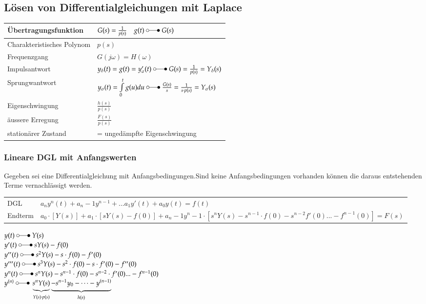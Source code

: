 \subsection{Lösen von Differentialgleichungen mit Laplace}
\begin{minipage}{11.5cm}
	\begin{tabular}{| l | l |}
		\hline
		Übertragungsfunktion & $G(s) = \frac{1}{p(s)} \quad g(t) \; \laplace \; G(s)$\\
		\hline Charakteristisches Polynom & $p(s)$\\
		\hline
		Frequenzgang & $G(j\omega) = H(\omega)$ \\
		\hline
		Impulsantwort & $y_{\delta}(t) = g(t) = y_{\sigma}'(t) \; \laplace \; G(s) = \frac{1}{p(s)}=Y_{\delta}(s)$\\
		\hline
		Sprungwantwort & $y_{\sigma}(t)=\int\limits_0^t g(u) du \; \laplace \; \frac{G(s)}{s} = \frac{1}{s \cdot p(s)} = Y_{\sigma}(s)$\\
		\hline
		Eigenschwingung & $\frac{h(s)}{p(s)}$ \\
		\hline
		äussere Erregung & $\frac{F(s)}{p(s)}$ \\
		\hline
		stationärer Zustand & = ungedämpfte Eigenschwingung\\
		\hline
	\end{tabular}
\end{minipage}
\newpage
\subsubsection{Lineare DGL mit Anfangswerten}
Gegeben sei eine Differentialgleichung mit Anfangsbedingungen.Sind keine Anfangsbedingungen vorhanden können die daraus entstehenden Terme vernachlässigt werden.\\
\vspace{2pt}
\begin{tabular}{l l}
	DGL & $a_n y^{n}(t)+a_n-1 y^{n-1}+...a_1 y'(t)+a_0 y(t)=f(t)$\\
	Endterm & $a_0\cdot[Y(s)]+a_1 \cdot [sY(s)-f(0)]+a_n-1y^n-1 \cdot [s^nY(s)-s^{n-1} \cdot f(0)-s^{n-2}f'(0)...-f^{n-1}(0)]=F(s)$\\
\end{tabular}

\begin{minipage}{15cm}
	$y(t) \; \laplace \;  Y(s)$\\
	$y'(t) \; \laplace \; sY(s) - f(0)$\\
	$y''(t) \; \laplace \; s^2Y(s)-s\cdot f(0) - f'(0)$\\
	$y'''(t) \; \laplace \; s^3Y(s)-s^2\cdot f(0)-s \cdot f'(0) - f''(0)$\\
	$y^n(t) \; \laplace \; s^nY(s)-s^{n-1}\cdot f(0)-s^{n-2} \cdot f'(0) ...- f^{n-1}(0)$\\
	$y^{(n)} \; \laplace \; 
	\underbrace{s^nY(s)}_{Y(s) \cdot p(s)}
	\underbrace{-s^{n-1}y_0 - \dots - y^{(n-1)}}_{h(s)}$\\
\end{minipage}
\newpage
